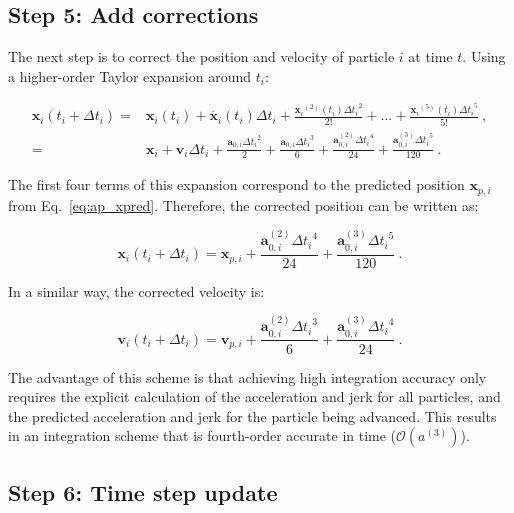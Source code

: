 \begin{appendixs}
	
	\subsection{Step 5: Add corrections}
	\label{ap:A.5}
	
	The next step is to correct the position and velocity of particle $i$ at time $t$. Using a higher-order Taylor expansion around $t_i$:
	
	\begin{align}
		\mathbf{x}_i(t_i + \Delta t_i) =& \mathbf{x}_i(t_i) + \dot{\mathbf{x}_i}(t_i)\Delta t_i + \frac{{\mathbf{x}_i}^{(2)}(t_i){\Delta t_i}^2}{2!} + ... + \frac{{\mathbf{x}_i}^{(5)}(t_i){\Delta t_i}^5}{5!}~,\\
		=& \mathbf{x}_i + \mathbf{v}_i \Delta t_i + \frac{\mathbf{a}_{0, i} {\Delta t_i}^2}{2} + \frac{\dot{\mathbf{a}}_{0, i} {\Delta t_i}^3}{6} + \frac{\mathbf{a}^{(2)}_{0, i} {\Delta t_i}^4}{24} + \frac{\mathbf{a}^{(3)}_{0, i} {\Delta t_i}^5}{120}~.
	\end{align}
	
	The first four terms of this expansion correspond to the predicted position $\mathbf{x}_{p, i}$ from Eq.~\eqref{eq:ap_xpred}. Therefore, the corrected position can be written as:
	
	\begin{equation}
		\mathbf{x}_i(t_i + \Delta t_i) = \mathbf{x}_{p, i} + \frac{\mathbf{a}^{(2)}_{0, i} {\Delta t_i}^4}{24} + \frac{\mathbf{a}^{(3)}_{0, i} {\Delta t_i}^5}{120}~. \label{eq:ap_xcorr}
	\end{equation}
	
	In a similar way, the corrected velocity is:
	
	\begin{equation}
		\mathbf{v}_i(t_i + \Delta t_i) = \mathbf{v}_{p, i} + \frac{\mathbf{a}^{(2)}_{0, i} {\Delta t_i}^3}{6} + \frac{\mathbf{a}^{(3)}_{0, i} {\Delta t_i}^4}{24}~. \label{eq:ap_vcorr}
	\end{equation}
	
	The advantage of this scheme is that achieving high integration accuracy only requires the explicit calculation of the acceleration and jerk for all particles, and the predicted acceleration and jerk for the particle being advanced. This results in an integration scheme that is fourth-order accurate in time ($\mathcal{O}(a^{(3)})$).
	
	\subsection{Step 6: Time step update}
	\label{ap:A.6}
	

\end{appendixs}
